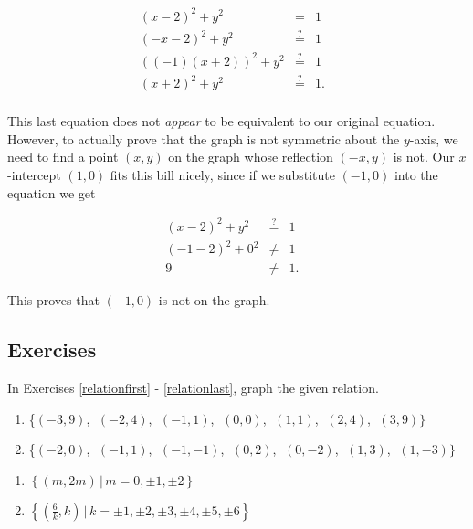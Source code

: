 \[ \begin{array}{rclr}  

(x-2)^2 + y^2 & = & 1 & \\
(-x-2)^2 + y^2 & \stackrel{?}{=} & 1 & \\
((-1)(x+2))^2 + y^2 & \stackrel{?}{=} & 1 & \\
(x+2)^2 + y^2 & \stackrel{?}{=} & 1. & \\

\end{array} \]

This last equation does not \emph{appear} to be equivalent to our original equation.  However, to actually prove that the graph is not symmetric about the $y$-axis, we need to find a point $(x,y)$ on the graph whose reflection $(-x,y)$ is not. Our $x$-intercept $(1,0)$ fits this bill nicely, since if we substitute $(-1,0)$ into the equation we get

\[ \begin{array}{rclr}   

(x-2)^2+y^2 & \stackrel{?}{=} & 1 & \\
(-1-2)^2 + 0^2 & \neq & 1 & \\
9 & \neq & 1. & 

\end{array} \]

This proves that $(-1,0)$ is not on the graph.

\newpage

\subsection{Exercises}

In Exercises \ref{relationfirst} - \ref{relationlast}, graph the given relation.

\begin{enumerate}

\item \{$(-3, 9)$, $\;(-2, 4)$, $\;(-1, 1)$, $\;(0, 0)$, $\;(1, 1)$, $\;(2, 4)$, $\;(3, 9)\}$ \label{relationfirst}
\item \{$(-2, 0)$, $\;(-1, 1)$, $\;(-1, -1)$, $\;(0, 2)$, $\;(0, -2)$, $\;(1, 3)$, $\;(1, -3)\}$

\setcounter{HW}{\value{enumi}}
\end{enumerate}


\begin{multicols}{2}
\begin{enumerate}
\setcounter{enumi}{\value{HW}}

\item  $\left\{ \left(m, 2m \right) \, | \, m = 0, \pm 1, \pm 2 \right\}$
\item  $\left\{ \left(\frac{6}{k}, k \right) \, | \, k = \pm 1, \pm 2, \pm 3, \pm 4, \pm 5, \pm 6 \right\}$

\setcounter{HW}{\value{enumi}}
\end{enumerate}
\end{multicols}


